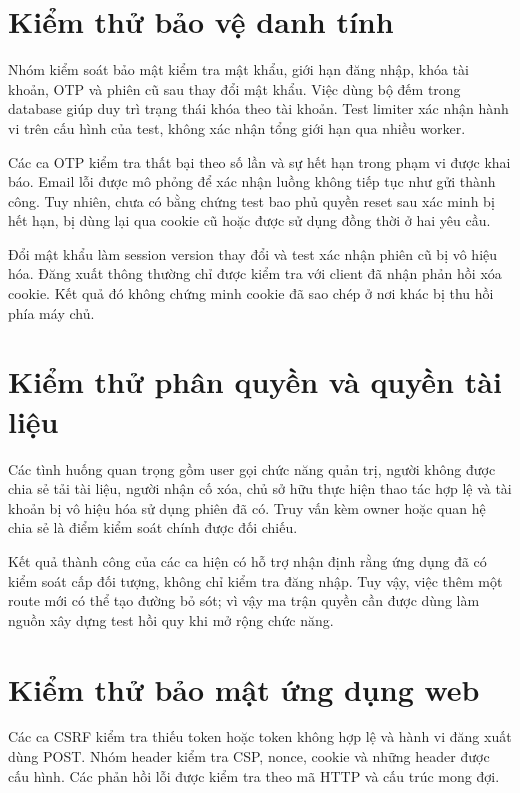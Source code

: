 \section{Kiểm thử bảo vệ danh tính}
Nhóm kiểm soát bảo mật kiểm tra mật khẩu, giới hạn đăng nhập, khóa tài khoản, OTP và phiên cũ sau thay đổi mật khẩu. Việc dùng bộ đếm trong database giúp duy trì trạng thái khóa theo tài khoản. Test limiter xác nhận hành vi trên cấu hình của test, không xác nhận tổng giới hạn qua nhiều worker.

Các ca OTP kiểm tra thất bại theo số lần và sự hết hạn trong phạm vi được khai báo. Email lỗi được mô phỏng để xác nhận luồng không tiếp tục như gửi thành công. Tuy nhiên, chưa có bằng chứng test bao phủ quyền reset sau xác minh bị hết hạn, bị dùng lại qua cookie cũ hoặc được sử dụng đồng thời ở hai yêu cầu.

Đổi mật khẩu làm session version thay đổi và test xác nhận phiên cũ bị vô hiệu hóa. Đăng xuất thông thường chỉ được kiểm tra với client đã nhận phản hồi xóa cookie. Kết quả đó không chứng minh cookie đã sao chép ở nơi khác bị thu hồi phía máy chủ.

\section{Kiểm thử phân quyền và quyền tài liệu}
Các tình huống quan trọng gồm user gọi chức năng quản trị, người không được chia sẻ tải tài liệu, người nhận cố xóa, chủ sở hữu thực hiện thao tác hợp lệ và tài khoản bị vô hiệu hóa sử dụng phiên đã có. Truy vấn kèm owner hoặc quan hệ chia sẻ là điểm kiểm soát chính được đối chiếu.

Kết quả thành công của các ca hiện có hỗ trợ nhận định rằng ứng dụng đã có kiểm soát cấp đối tượng, không chỉ kiểm tra đăng nhập. Tuy vậy, việc thêm một route mới có thể tạo đường bỏ sót; vì vậy ma trận quyền cần được dùng làm nguồn xây dựng test hồi quy khi mở rộng chức năng.

\section{Kiểm thử bảo mật ứng dụng web}
Các ca CSRF kiểm tra thiếu token hoặc token không hợp lệ và hành vi đăng xuất dùng POST. Nhóm header kiểm tra CSP, nonce, cookie và những header được cấu hình. Các phản hồi lỗi được kiểm tra theo mã HTTP và cấu trúc mong đợi.

